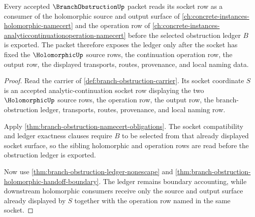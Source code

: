 \begin{theorem}
\label{thm:branch-obstruction-holomorphic-operation-sibling-route}
Every accepted $\BranchObstructionUp$ packet reads its socket row as a
consumer of the holomorphic source and output surface of
\autoref{ch:concrete-instances-holomorphic-namecert} and the operation row of
\autoref{ch:concrete-instances-analyticcontinuationoperation-namecert} before
the selected obstruction ledger $B$ is exported. The packet therefore exposes
the ledger only after the socket has fixed the $\HolomorphicUp$ source rows,
the continuation operation row, the output row, the displayed transports,
routes, provenance, and local naming data.
\end{theorem}
\begin{proof}
Read the carrier of \autoref{def:branch-obstruction-carrier}. Its socket
coordinate $S$ is an accepted analytic-continuation socket row displaying the
two $\HolomorphicUp$ source rows, the operation row, the output row, the
branch-obstruction ledger, transports, routes, provenance, and local naming
row.

Apply \autoref{thm:branch-obstruction-namecert-obligations}. The socket
compatibility and ledger exactness clauses require $B$ to be selected from
that already displayed socket surface, so the sibling holomorphic and
operation rows are read before the obstruction ledger is exported.

Now use \autoref{thm:branch-obstruction-ledger-nonescape} and
\autoref{thm:branch-obstruction-holomorphic-handoff-boundary}. The ledger
remains boundary accounting, while downstream holomorphic consumers receive
only the source and output surface already displayed by $S$ together with the
operation row named in the same socket.
\end{proof}

